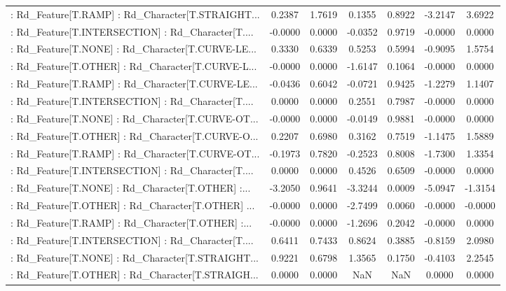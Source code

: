 \begin{longtable}{p{4cm}cccccc}
 : Rd\_Feature[T.RAMP] : Rd\_Character[T.STRAIGHT... &  0.2387 &    1.7619 &  0.1355 &       0.8922 & -3.2147 &  3.6922 \\
 : Rd\_Feature[T.INTERSECTION] : Rd\_Character[T.... & -0.0000 &    0.0000 & -0.0352 &       0.9719 & -0.0000 &  0.0000 \\
 : Rd\_Feature[T.NONE] : Rd\_Character[T.CURVE-LE... &  0.3330 &    0.6339 &  0.5253 &       0.5994 & -0.9095 &  1.5754 \\
 : Rd\_Feature[T.OTHER] : Rd\_Character[T.CURVE-L... & -0.0000 &    0.0000 & -1.6147 &       0.1064 & -0.0000 &  0.0000 \\
 : Rd\_Feature[T.RAMP] : Rd\_Character[T.CURVE-LE... & -0.0436 &    0.6042 & -0.0721 &       0.9425 & -1.2279 &  1.1407 \\
 : Rd\_Feature[T.INTERSECTION] : Rd\_Character[T.... &  0.0000 &    0.0000 &  0.2551 &       0.7987 & -0.0000 &  0.0000 \\
 : Rd\_Feature[T.NONE] : Rd\_Character[T.CURVE-OT... & -0.0000 &    0.0000 & -0.0149 &       0.9881 & -0.0000 &  0.0000 \\
 : Rd\_Feature[T.OTHER] : Rd\_Character[T.CURVE-O... &  0.2207 &    0.6980 &  0.3162 &       0.7519 & -1.1475 &  1.5889 \\
 : Rd\_Feature[T.RAMP] : Rd\_Character[T.CURVE-OT... & -0.1973 &    0.7820 & -0.2523 &       0.8008 & -1.7300 &  1.3354 \\
 : Rd\_Feature[T.INTERSECTION] : Rd\_Character[T.... &  0.0000 &    0.0000 &  0.4526 &       0.6509 & -0.0000 &  0.0000 \\
 : Rd\_Feature[T.NONE] : Rd\_Character[T.OTHER] :... & -3.2050 &    0.9641 & -3.3244 &       0.0009 & -5.0947 & -1.3154 \\
 : Rd\_Feature[T.OTHER] : Rd\_Character[T.OTHER] ... & -0.0000 &    0.0000 & -2.7499 &       0.0060 & -0.0000 & -0.0000 \\
 : Rd\_Feature[T.RAMP] : Rd\_Character[T.OTHER] :... & -0.0000 &    0.0000 & -1.2696 &       0.2042 & -0.0000 &  0.0000 \\
 : Rd\_Feature[T.INTERSECTION] : Rd\_Character[T.... &  0.6411 &    0.7433 &  0.8624 &       0.3885 & -0.8159 &  2.0980 \\
 : Rd\_Feature[T.NONE] : Rd\_Character[T.STRAIGHT... &  0.9221 &    0.6798 &  1.3565 &       0.1750 & -0.4103 &  2.2545 \\
 : Rd\_Feature[T.OTHER] : Rd\_Character[T.STRAIGH... &  0.0000 &    0.0000 &     NaN &          NaN &  0.0000 &  0.0000 \\

\end{longtable}
